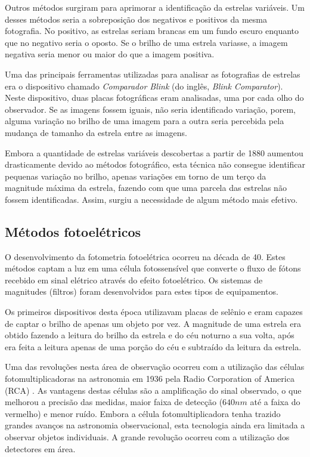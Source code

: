 Outros métodos surgiram para aprimorar a identificação da estrelas variáveis. Um desses métodos seria a sobreposição dos negativos e positivos da mesma fotografia. No positivo, as estrelas seriam brancas em um fundo escuro enquanto que no negativo seria o oposto. Se o brilho de uma estrela variasse, a imagem negativa seria menor ou maior do que a imagem positiva. 

Uma das principais ferramentas utilizadas para analisar as fotografias de estrelas era o dispositivo chamado \textit{Comparador Blink} (do inglês, \textit{Blink Comparator}). Neste dispositivo, duas placas fotográficas eram analisadas, uma por cada olho do observador. Se as imagens fossem iguais, não seria identificado variação, porem, alguma variação no brilho de uma imagem para a outra seria percebida pela mudança de tamanho da estrela entre as imagens.

Embora a quantidade de estrelas variáveis descobertas a partir de 1880 aumentou drasticamente devido ao métodos fotográfico, esta técnica não consegue identificar pequenas variação no brilho, apenas variações em torno de um terço da magnitude máxima da estrela, fazendo com que uma parcela das estrelas não fossem identificadas. Assim, surgiu a necessidade de algum método mais efetivo.


\subsection{Métodos fotoelétricos}

O desenvolvimento da fotometria fotoelétrica ocorreu na década de 40. Estes métodos captam a luz em uma célula fotossensível que converte o fluxo de fótons recebido em sinal elétrico através do efeito fotoelétrico. Os sistemas de magnitudes (filtros) foram desenvolvidos para estes tipos de equipamentos.

Os primeiros dispositivos  desta época utilizavam placas de selênio e eram capazes de captar o brilho de apenas um objeto por vez. A magnitude de uma estrela era obtido fazendo a leitura do brilho da estrela e do céu noturno a sua volta, após era feita a leitura apenas de uma porção do céu e subtraído da leitura da estrela. 

Uma das revoluções nesta área de observação ocorreu com a utilização das células fotomultiplicadoras na astronomia em 1936 pela Radio Corporation of America (RCA) \citep{Miles2007}. As vantagens destas células são a amplificação do sinal observado, o que melhorou a precisão das medidas, maior faixa de detecção ($640 \si{nm}$ até a faixa do vermelho) e menor ruído. Embora a célula fotomultiplicadora tenha trazido grandes avanços na astronomia observacional, esta tecnologia ainda era limitada a observar objetos individuais. A grande revolução ocorreu com a utilização dos detectores em área.

